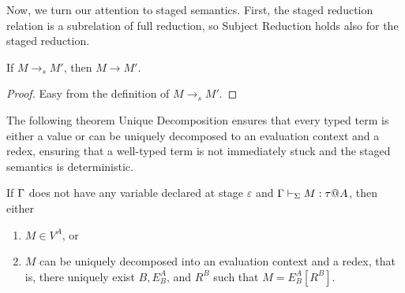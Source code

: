 Now, we turn our attention to staged semantics.  First, the staged
reduction relation is a subrelation of full reduction, so Subject
Reduction holds also for the staged reduction.

\begin{lemma}
  If $M \longrightarrow_s M'$, then $M \longrightarrow M'$.
\end{lemma}
\begin{proof}
    Easy from the definition of \( M \longrightarrow_s M' \).
\end{proof}

The following theorem Unique Decomposition ensures that every typed
term is either a value or can be uniquely decomposed to an evaluation
context and a redex, ensuring that a well-typed term is not
immediately stuck and the staged semantics is deterministic.

\begin{lemma}
    If $\Gamma$ does not have any variable declared at stage $\varepsilon$
    and $\Gamma \vdash_\Sigma M : \tau @ A$, then either
    \begin{enumerate}
        \item $ M \in V^A$, or
        \item $M$ can be uniquely decomposed into an evaluation context and a redex, that is, there uniquely exist $B, E^A_B$, and $R^B$ such that $M = E^A_B[R^B]$.
    \end{enumerate}
\end{lemma}

